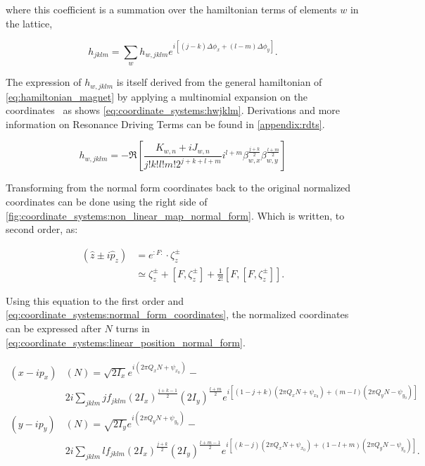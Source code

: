 where this coefficient is a summation over the hamiltonian terms of elements $w$ in the lattice,

\begin{equation}
    h_{jklm} = \sum_w h_{w,jklm} e^{i [(j-k)\Delta \phi_x + (l-m) \Delta \phi_y]}.
\end{equation}

The expression of $h_{w,jklm}$ is itself derived from the general hamiltonian 
of \cref{eq:hamiltonian_magnet} by applying a multinomial expansion on the
coordinates~\cite{franchi_studies_2006} as shows \cref{eq:coordinate_systems:hwjklm}.
Derivations and more information on Resonance Driving Terms can be found in \cref{appendix:rdts}.

\begin{equation}
    h_{w,jklm} = -\Re \left[\frac{K_{w,n} + iJ_{w,n}}{j!k!l!m! 2^{j+k+l+m}}
    i^{l+m} \beta_{w,x}^{\frac{j+k}{2}} \beta_{w,y}^{\frac{l+m}{2}} \right]
    \label{eq:coordinate_systems:hwjklm}
\end{equation}

Transforming from the normal form coordinates back to the original normalized coordinates can be
done using the right side of \cref{fig:coordinate_systems:non_linear_map_normal_form}. Which is
written, to second order, as:

\begin{equation}
    \begin{aligned}
        (\hat{z} \pm i\hat{p}_z) &= e^{: F:} \cdot \zeta_z^{ \pm} \\
                   &\simeq \zeta_z^{ \pm}+\left[F, \zeta_z^{ \pm}\right] 
                        + \frac{1}{2!} \left[ F, \left[ F, \zeta_z^\pm \right]\right].
    \end{aligned}
\end{equation}

Using this equation to the first order and \cref{eq:coordinate_systems:normal_form_coordinates}, the
normalized coordinates can be expressed after $N$ turns in
\cref{eq:coordinate_systems:linear_position_normal_form}.

\small
\begin{equation}
    \begin{aligned}
    (x-ip_x)&(N)= \sqrt{2 I_x} e^{i\left(2 \pi Q_x N+\psi_{x_0}\right)}- \\
    & 2 i \sum_{j k l m} j f_{j k l m}\left(2 I_x\right)^{\frac{j+k-1}{2}}\left(2 I_y\right)^{\frac{l+m}{2}} e^{i\left[(1-j+k)\left(2 \pi Q_x N+\psi_{x_0}\right)+(m-l)\left(2 \pi Q_y N-\psi_{y_0}\right)\right]} \\
    (y-ip_y)&(N)= \sqrt{2 I_y} e^{i\left(2 \pi Q_y N+\psi_{y_0}\right)}- \\
    & 2 i \sum_{j k l m} l f_{j k l m}\left(2 I_x\right)^{\frac{j+k}{2}}\left(2 I_y\right)^{\frac{l+m-1}{2}} e^{i\left[(k-j)\left(2 \pi Q_x N+\psi_{x_0}\right)+(1-l+m)\left(2 \pi Q_y N-\psi_{y_0}\right)\right]} .
    \end{aligned}
    \label{eq:coordinate_systems:linear_position_normal_form}
\end{equation}
\normalsize

